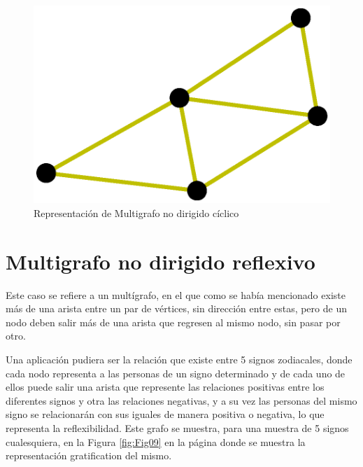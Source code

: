 \documentclass{article}
\begin{document}


\begin{figure}
    \centering
    \includegraphics[scale=0.6]{imagenes/Fig08.eps}
    \caption{Representación de Multigrafo no dirigido cíclico}
    \label{fig:Fig08}
\end{figure}

\section{Multigrafo no dirigido reflexivo}

Este caso se refiere a un multígrafo, en el que como se había mencionado existe más de una arista entre un par de vértices, sin dirección entre estas, pero de un nodo deben salir más de una arista que regresen al mismo nodo, sin pasar por otro.

Una aplicación pudiera ser la relación que existe entre 5 signos zodiacales, donde cada nodo representa a las personas de un signo determinado y de cada uno de ellos puede salir una arista que represente las relaciones positivas entre los diferentes signos y otra las relaciones negativas, y a su vez las personas del mismo signo se relacionarán con sus iguales de manera positiva o negativa, lo que representa la reflexibilidad. Este grafo se muestra, para una muestra de 5 signos cualesquiera, en la Figura \ref{fig:Fig09} en la página \pageref{fig:Fig09} donde se muestra la representación gratification del mismo.



\end{document}
